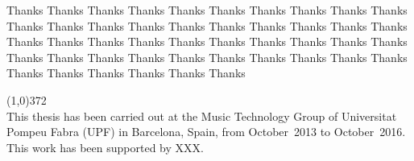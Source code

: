 Thanks Thanks 
Thanks Thanks 
Thanks Thanks 
Thanks Thanks 
Thanks Thanks 
Thanks Thanks 
Thanks Thanks 
Thanks Thanks 
Thanks Thanks 
Thanks Thanks 
Thanks Thanks 
Thanks Thanks 
Thanks Thanks 
Thanks Thanks 
Thanks Thanks 
Thanks Thanks 
Thanks Thanks 
Thanks Thanks 
Thanks Thanks 
Thanks Thanks 
Thanks Thanks 
Thanks Thanks 
Thanks Thanks 
\vspace*{\fill}

\line(1,0){372}\\
\footnotesize
This thesis has been carried out at the Music Technology Group of Universitat Pompeu Fabra (UPF) in Barcelona, Spain, from October~2013 to October~2016. This work has been supported by XXX.
\normalsize